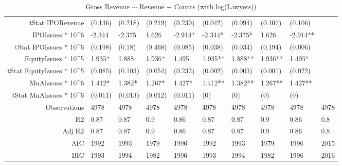 \begin{table}[ht]
\begin{tabular}{rlllllllll}
  tStat IPORevenue & (0.136) & (0.218) & (0.219) & (0.239) & (0.042) & (0.094) & (0.107) & (0.106) &  \\ 
  IPOIssues * 10^6 & -2.344 & -2.375 & 1.626 & -2.914$^{+}$ & -2.344* & -2.375* & 1.626 & -2.914** &  \\ 
  tStat IPOIssues * 10^6 & (0.198) & (0.18) & (0.468) & (0.085) & (0.038) & (0.034) & (0.194) & (0.006) &  \\ 
  EquityIssues * 10^5 & 1.935$^{+}$ & 1.888 & 1.936$^{+}$ & 1.495 & 1.935** & 1.888** & 1.936** & 1.495* &  \\ 
  tStat EquityIssues * 10^5 & (0.085) & (0.103) & (0.054) & (0.232) & (0.002) & (0.003) & (0.001) & (0.022) &  \\ 
  MnAIssues * 10^6 & 1.412* & 1.382* & 1.267* & 1.427* & 1.412** & 1.382** & 1.267** & 1.427** &  \\ 
  tStat MnAIssues * 10^6 & (0.011) & (0.013) & (0.012) & (0.011) & (0) & (0) & (0) & (0) &  \\ 
  Observations & 4978 & 4978 & 4978 & 4978 & 4978 & 4978 & 4978 & 4978 & 4978 \\ 
  R2 & 0.87 & 0.87 & 0.9 & 0.86 & 0.87 & 0.87 & 0.9 & 0.86 & 0.8 \\ 
  Adj R2 & 0.87 & 0.87 & 0.9 & 0.86 & 0.87 & 0.87 & 0.9 & 0.86 & 0.8 \\ 
  AIC & 1992 & 1993 & 1979 & 1996 & 1992 & 1993 & 1979 & 1996 & 2015 \\ 
  BIC & 1993 & 1994 & 1982 & 1996 & 1993 & 1994 & 1982 & 1996 & 2016 \\ 
   \hline
\end{tabular}
\caption{Gross Revenue $\sim$ Revenue + Counts (with log(Lawyers))} 
\end{table}
